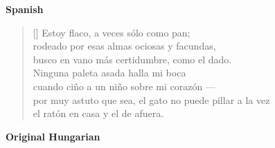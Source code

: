 \documentclass[a4paper,12pt,twoside,final]{book}
\begin{document}
\noindent \textbf{Spanish}


\settowidth{\versewidth}{por muy astuto que sea, el gato no puede pillar a la vez}

\begin{verse}[\versewidth]
  Estoy flaco, a veces sólo como pan; \\
  rodeado por esas almas ociosas y facundas, \\
  busco en vano más certidumbre, como el dado. \\
  Ninguna paleta asada halla mi boca \\
  cuando ciño a un niño sobre mi corazón --- \\
  por muy astuto que sea, el gato no puede pillar a la vez \\
  el ratón en casa y el de afuera. \\
\end{verse}

\newpage


\noindent \textbf{Original Hungarian}


\settowidth{\versewidth}{számhoz s szivemhez kisgyerek ---}
\end{document}
